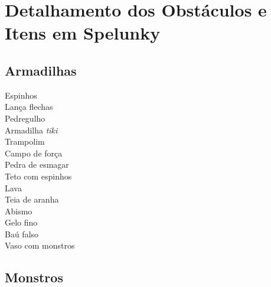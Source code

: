 \chapter{\label{appendix:spelunky-details}Detalhamento dos Obstáculos e
Itens em Spelunky}

\section{\label{section:spelunky-traps}Armadilhas}

\begin{description}
    \item[Espinhos]
    \item[Lança flechas]
    \item[Pedregulho]
    \item[Armadilha \textit{tiki}]
    \item[Trampolim]
    \item[Campo de força]
    \item[Pedra de esmagar]
    \item[Teto com espinhos]
    \item[Lava]
    \item[Teia de aranha]
    \item[Abismo]
    \item[Gelo fino]
    \item[Baú falso]
    \item[Vaso com monstros]
\end{description}

\section{\label{section:spelunky-monsters}Monstros}

